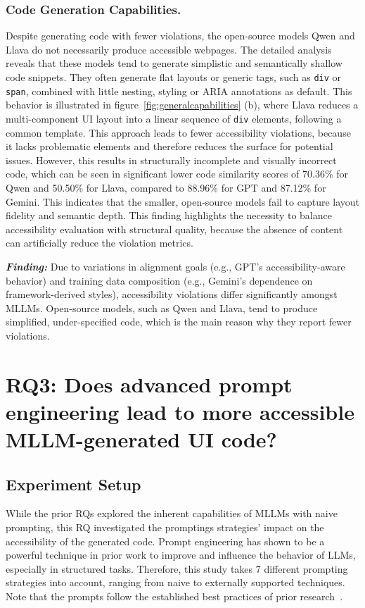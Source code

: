 \subsubsection{Code Generation Capabilities.} Despite generating
code with fewer violations, the open-source models Qwen and 
Llava do not necessarily produce accessible webpages.
The detailed analysis reveals that these models tend to generate 
simplistic and semantically shallow code snippets. They often 
generate flat layouts or generic tags, such as \texttt{div} or \texttt{span},
combined with little nesting, styling or ARIA annotations as default. 
This behavior is illustrated in figure~\ref{fig:generalcapabilities} (b),
where Llava reduces a multi-component UI layout into a linear 
sequence of \texttt{div} elements, following a common template.
This approach leads to fewer accessibility violations, 
because it lacks problematic elements and therefore reduces the 
surface for potential issues. However, this results in 
structurally incomplete and visually incorrect code, which can be 
seen in significant lower code similarity scores of 70.36\% for Qwen and
50.50\% for Llava, compared to 88.96\% for GPT and 87.12\% for Gemini.
This indicates that the smaller, open-source models fail to capture 
layout fidelity and semantic depth. This finding highlights the 
necessity to balance accessibility evaluation with structural 
quality, because the absence of content can artificially 
reduce the violation metrics.

\begin{center}
\begin{tcolorbox}[colback=black!5!white,colframe=black!75!black,bottom=-0.05pt,top=-0.05pt]
\textit{\textbf{Finding:}} Due to variations in alignment goals (e.g., GPT's accessibility-aware behavior) and training data composition (e.g., Gemini's dependence on framework-derived styles), accessibility violations differ significantly amongst MLLMs. Open-source models, such as Qwen and Llava, tend to produce simplified, under-specified code, which is the main reason why they report fewer violations.
\end{tcolorbox}
\end{center}


\section{RQ3: Does advanced prompt engineering lead to more accessible MLLM-generated
UI code?}
\subsection{Experiment Setup}
While the prior RQs explored the inherent capabilities of MLLMs with naive
prompting, this RQ investigated the promptings strategies' impact 
on the accessibility of the generated code. Prompt engineering has shown 
to be a powerful technique in prior work to improve and influence the 
behavior of LLMs, especially in structured tasks. Therefore, this study 
takes 7 different prompting strategies into account, ranging from 
naive to externally supported techniques. Note that the prompts follow 
the established best practices of prior research~\cite{suh2025accessiblecode, xiao2024interaction2code}.

